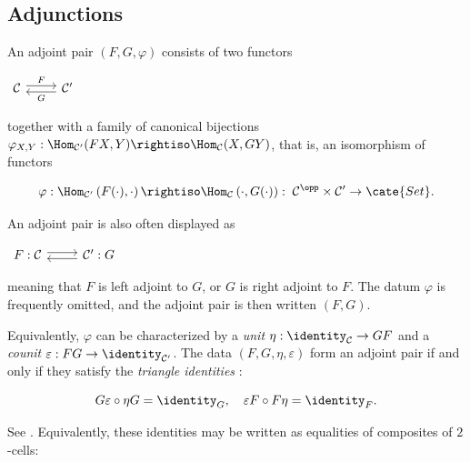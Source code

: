\subsection*{Adjunctions}

An adjoint pair $(F,G,\varphi)$ consists of two functors

$\begin{tikzcd}
	\mathcal{C} \arrow[shift left, r, "F"] & \mathcal{C}' \arrow[shift left, l, "G"]
\end{tikzcd}$

together with a family of canonical bijections $\varphi_{X,Y}:\Hom_{\mathcal C'}(FX,Y)\rightiso\Hom_{\mathcal C}(X,GY)$, that is, an isomorphism of functors

\[ \varphi: \Hom_{\mathcal{C}'}\left(F(\cdot), \cdot \right) \rightiso
\Hom_{\mathcal{C}}\left(\cdot, G(\cdot) \right): \;
\mathcal{C}^{\opp} \times \mathcal{C}' \to \cate{Set}. \]

An adjoint pair is also often displayed as

$\begin{tikzcd}
	F: \mathcal{C} \arrow[shift left, r] & \mathcal{C}' \arrow[l, shift left] : G
\end{tikzcd}$

meaning that $F$ is left adjoint to $G$, or $G$ is right adjoint to $F$. The datum $\varphi$ is frequently omitted, and the adjoint pair is then written $(F,G)$.

Equivalently, $\varphi$ can be characterized by a \emph{unit} $\eta:\identity_{\mathcal C}\to GF$ and a \emph{counit} $\varepsilon:FG\to\identity_{\mathcal C'}$. The data $(F,G,\eta,\varepsilon)$ form an adjoint pair if and only if they satisfy the \emph{triangle identities}
:

\[ G\varepsilon \circ \eta G = \identity_G, \quad
\varepsilon F \circ F\eta = \identity_F. \]

See \cite[(2.6) + Proposition~2.6.5]{Li1}. Equivalently, these identities may be written as equalities of composites of $2$-cells:

